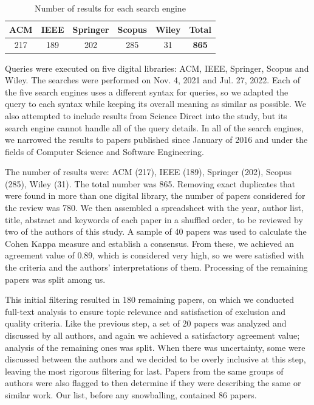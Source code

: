 

\label{subsec:execution}

\begin{table}[]
    \centering
    \begin{tabular}{cccccc}
        \toprule
        ACM & IEEE & Springer & Scopus & Wiley & \textbf{Total} \\
        \midrule
        217 & 189 & 202 & 285 & 31 & \textbf{865} \\
        \bottomrule
    \end{tabular}
    \caption{Number of results for each search engine}
    \label{tab:numberofresults}
\end{table}


Queries were executed on five digital libraries: ACM, IEEE, Springer, Scopus and Wiley.
The searches were performed on Nov. 4, 2021 and Jul. 27, 2022.
Each of the five search engines uses a different syntax for queries, so we adapted the query to each syntax while keeping its overall meaning as similar as possible.
We also attempted to include results from Science Direct into the study, but its search engine cannot handle all of the query details.
In all of the search engines, we narrowed the results to papers published since January of 2016 and under the fields of Computer Science and Software Engineering.

The number of results were: ACM (217), IEEE (189), Springer (202), Scopus (285), Wiley (31).
The total number was 865.
Removing exact duplicates that were found in more than one digital library, the number of papers considered for the review was 780.
We then assembled a spreadsheet with the year, author list, title, abstract and keywords of each paper in a shuffled order, to be reviewed by two of the authors of this study.
A sample of 40 papers was used to calculate the Cohen Kappa measure and establish a consensus.
From these, we achieved an agreement value of 0.89, which is considered very high, so we were satisfied with the criteria and the authors' interpretations of them.
Processing of the remaining papers was split among us.

This initial filtering resulted in 180 remaining papers, on which we conducted full-text analysis to ensure topic relevance and satisfaction of exclusion and quality criteria.
Like the previous step, a set of 20 papers was analyzed and discussed by all authors, and again we achieved a satisfactory agreement value; analysis of the remaining ones was split.
When there was uncertainty, some were discussed between the authors and we decided to be overly inclusive at this step, leaving the most rigorous filtering for last.
Papers from the same groups of authors were also flagged to then determine if they were describing the same or similar work.
Our list, before any snowballing, contained 86 papers.

